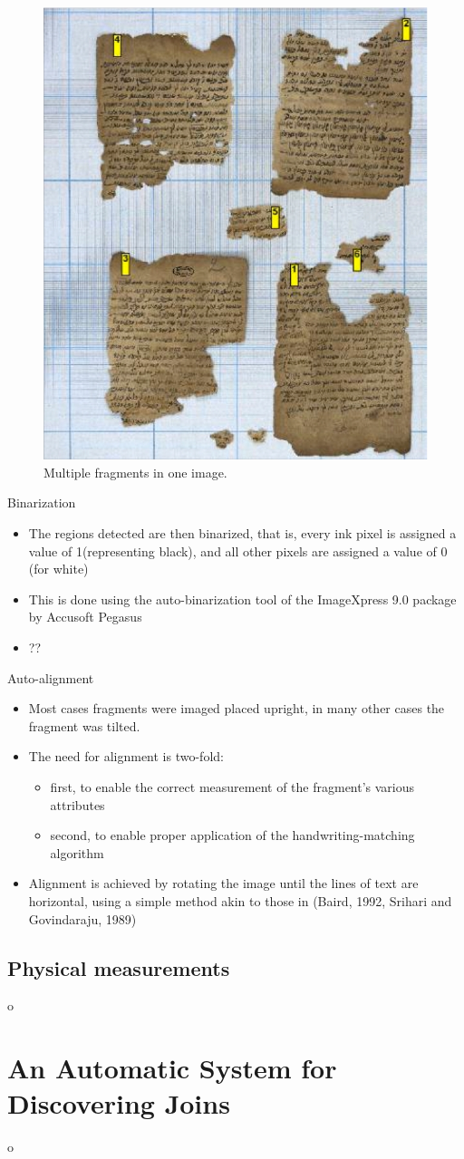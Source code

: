 \documentclass[12pt]{beamer}
\begin{document}
\begin{frame}
\begin{figure}
\includegraphics[height=0.6\textwidth]{images/3.JPG}
\caption{Multiple fragments in one image.}\label{fig:multifragment}
\end{figure}
\end{frame}

\begin{frame}{Binarization}
\begin{itemize}
\item The regions detected are then binarized, that is, every ink pixel is assigned a value of 1(representing black), and all other pixels are assigned a value of 0 (for white)
\item This is done using the auto-binarization tool of the ImageXpress 9.0 package by Accusoft Pegasus
\item ??
\end{itemize}
\end{frame}

\begin{frame}{Auto-alignment}
\begin{itemize}
\item Most cases fragments were imaged placed upright, in many other cases the fragment was tilted.
\item The need for alignment is two-fold:
\begin{itemize}
\item first, to enable the correct measurement of the fragment’s various attributes
\item second, to enable proper application of the handwriting-matching algorithm
\end{itemize}
\item Alignment is achieved by rotating the image until the lines of text are horizontal, using a simple method akin to those in (Baird, 1992, Srihari and Govindaraju, 1989)
\end{itemize}
\end{frame}

\subsection{Physical measurements}
\begin{frame}{o}

\end{frame}

\section{An Automatic System for Discovering Joins}
\begin{frame}{o}

\end{frame}
\end{document}
